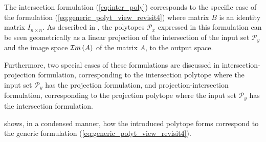 The intersection formulation (\ref{eq:inter_poly}) corresponds to the specific case of the formulation 
(\ref{eq:generic_polyt_view_revisit4}) where matrix $B$ is an identity matrix $I_{n\times n}$. As described in , the polytopes $\mathcal{P}_x$ expressed in this formulation can be seen geometrically as a linear projection of the intersection of the input set $\mathcal{P}_y$ and the image space $\mathcal{I}m\left(A\right)$ of the matrix $A$, to the output space. 

Furthermore, two special cases of these formulations are discussed in  intersection-projection formulation, corresponding to the intersection polytope where the input set $\mathcal{P}_y$ has the projection formulation, and projection-intersection formulation, corresponding to the projection polytope where the input set $\mathcal{P}_y$ has the intersection formulation. 

 shows, in a condensed manner, how the introduced polytope forms correspond to the generic formulation (\ref{eq:generic_polyt_view_revisit4}).


